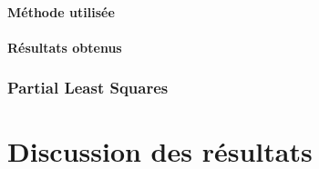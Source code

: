 \subsubsection{Méthode utilisée}


\subsubsection{Résultats obtenus}




\subsection{Partial Least Squares}



\chapter{Discussion des résultats}



